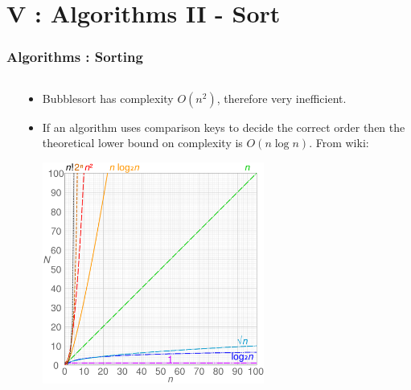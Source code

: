 \section{V : Algorithms II - Sort}
\label{chap:algos2}


\begin{frame}[fragile]
\frametitle{Algorithms : Sorting}
\begin{columns}[T]

\begin{column}{0.45\textwidth}

\end{column}

\pause
\begin{column}{0.45\textwidth}
\begin{itemize}[<+->]
\item Bubblesort has complexity $O(n^2)$, therefore very inefficient.
\item If an algorithm uses comparison keys to decide the correct order
then the theoretical lower bound on complexity is $O(n \log n )$. From wiki:
\pause
\begin{center}
\includegraphics[width=0.6\textwidth]{../Images/1280px-Comparison_computational_complexity.png}
\end{center}
\end{itemize}
\end{column}

\end{columns}
\end{frame}


